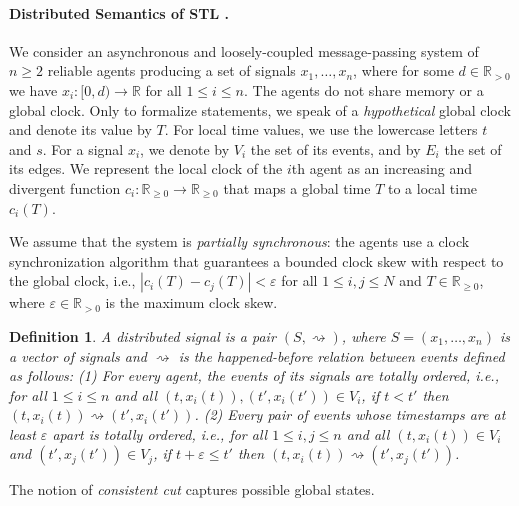 \documentclass[iicol,lineno]{sn-jnl}
\newcommand{\hb}{\rightsquigarrow}
\newcommand{\R}{\mathbb{R}}
\newcommand{\?}{\text{?}}
\newtheorem{definition}{Definition}
\begin{document}
	\paragraph*{Distributed Semantics of STL \cite{MomtazAB23}.}
	We consider an asynchronous and loosely-coupled message-passing system of $n \geq 2$ reliable agents producing a set of signals $x_1, \ldots, x_n$, where for some $d \in \R_{> 0}$ we have $x_i : [0,d) \to \R$ for all $1 \leq i \leq n$.
	The agents do not share memory or a global clock.
	Only to formalize statements, we speak of a \emph{hypothetical} global clock and denote its value by $T$.
	For local time values, we use the lowercase letters $t$ and $s$.
	For a signal $x_i$, we denote by $V_i$ the set of its events, and by $E_i$ the set of its edges.
	We represent the local clock of the $i$th agent as an increasing and divergent function $c_i : 
	\R_{\geq 0} \to \R_{\geq 0}$ that maps a global time $T$ to a local time $c_i(T)$.
	
	We assume that the system is \emph{partially synchronous}: the agents use a clock synchronization algorithm that guarantees a bounded clock skew with respect to the global clock, i.e., $|c_i(T) - c_j(T)| < \varepsilon$ for all $1 \leq i,j \leq N$ and $T \in \R_{\geq 0}$, where $\varepsilon \in \R_{> 0}$ is the maximum clock skew.
	
	\begin{definition} \label{defn:hb}
		A \emph{distributed signal} is a pair $(S, {\hb})$, where $S = (x_1, \ldots, x_n)$ is a vector of 
		signals and ${\hb}$ is the happened-before relation between events defined as follows:
		(1) For every agent, the events of its signals are totally ordered, i.e., for all $1 \leq i \leq n$ and all $(t, x_i(t)), (t', x_i(t')) \in V_i$, if $t < t'$ then $(t, x_i(t)) \hb (t', x_i(t'))$.
		(2) Every pair of events whose timestamps are at least $\varepsilon$ apart is totally ordered, i.e., for all $1 \leq i,j \leq n$ and all $(t, x_i(t)) \in V_i$ and $(t', x_j(t')) \in V_j$, if $t + \varepsilon \leq t'$ then $(t, x_i(t)) \hb (t', x_j(t'))$.
	\end{definition}
	
	The notion of \emph{consistent cut} captures possible global states.
	
\end{document}
